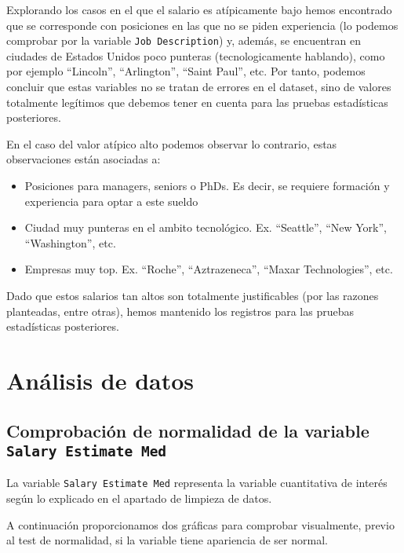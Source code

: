 \documentclass[
]{article}
\providecommand{\tightlist}{%
  \setlength{\itemsep}{0pt}\setlength{\parskip}{0pt}}
\begin{document}
Explorando los casos en el que el salario es atípicamente bajo hemos
encontrado que se corresponde con posiciones en las que no se piden
experiencia (lo podemos comprobar por la variable
\texttt{Job\ Description}) y, además, se encuentran en ciudades de
Estados Unidos poco punteras (tecnologicamente hablando), como por
ejemplo ``Lincoln'', ``Arlington'', ``Saint Paul'', etc. Por tanto,
podemos concluir que estas variables no se tratan de errores en el
dataset, sino de valores totalmente legítimos que debemos tener en
cuenta para las pruebas estadísticas posteriores.

En el caso del valor atípico alto podemos observar lo contrario, estas
observaciones están asociadas a:

\begin{itemize}
\tightlist
\item
  Posiciones para managers, seniors o PhDs. Es decir, se requiere
  formación y experiencia para optar a este sueldo
\item
  Ciudad muy punteras en el ambito tecnológico. Ex. ``Seattle'', ``New
  York'', ``Washington'', etc.
\item
  Empresas muy top. Ex. ``Roche'', ``Aztrazeneca'', ``Maxar
  Technologies'', etc.
\end{itemize}

Dado que estos salarios tan altos son totalmente justificables (por las
razones planteadas, entre otras), hemos mantenido los registros para las
pruebas estadísticas posteriores.

\hypertarget{anuxe1lisis-de-datos}{%
\section{Análisis de datos}\label{anuxe1lisis-de-datos}}

\hypertarget{comprobaciuxf3n-de-normalidad-de-la-variable-salary-estimate-med}{%
\subsection{\texorpdfstring{Comprobación de normalidad de la variable
\texttt{Salary\ Estimate\ Med}}{Comprobación de normalidad de la variable Salary Estimate Med}}\label{comprobaciuxf3n-de-normalidad-de-la-variable-salary-estimate-med}}

La variable \texttt{Salary\ Estimate\ Med} representa la variable
cuantitativa de interés según lo explicado en el apartado de limpieza de
datos.

A continuación proporcionamos dos gráficas para comprobar visualmente,
previo al test de normalidad, si la variable tiene apariencia de ser
normal.
\end{document}
